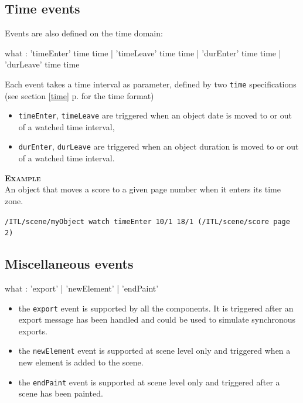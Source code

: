 \documentclass[a4paper,twoside]{report}
\newcommand{\subsublevel}[1]	{\subsection{#1}}
\newcommand{\fullref}[1]	{\ref{#1} p.\pageref{#1}}
\newcommand{\OSC}[1]		{\texttt{#1}}
\newcommand{\example}		{\textbf{\hspace{-1.5cm}\textbf{\textsc{Example }}}}
\newcommand{\samplev}[1]			{\begin{center}\colorbox{mygrey}{
								\begin{minipage}[t]{\columnwidth} 
								{\small \texttt{#1}}
								\end{minipage}}\end{center}}
\begin{document}
\subsublevel{Time events}
\label{timeevents}

Events are also defined on the time domain:
\begin{rail}
what : 	'timeEnter' time time | 'timeLeave' time time 
		| 'durEnter' time time | 'durLeave' time time 
\end{rail}

Each event takes a time interval as parameter, defined by two \OSC{time} specifications (see section \fullref{time} for the time format)

\begin{itemize}
\item \OSC{timeEnter}, \OSC{timeLeave} are triggered when an object date is moved to or out of a watched time interval,
\item \OSC{durEnter}, \OSC{durLeave} are triggered when an object duration is moved to or out of a watched time interval.
\end{itemize}

\example \\
An object that moves a score to a given page number when it enters its time zone.
\samplev{/ITL/scene/myObject watch timeEnter 10/1 18/1 (/ITL/scene/score page 2)}


\subsublevel{Miscellaneous events}
\label{miscevents}

\begin{rail}
what : 	  'export'
		| 'newElement'
		| 'endPaint'
\end{rail}

\begin{itemize}
\item the \OSC{export} event is supported by all the components. It is triggered after an export message has been handled and could be used to simulate synchronous exports.
\item the \OSC{newElement} event is supported at scene level only and triggered when a new element is added to the scene.
\item the \OSC{endPaint} event is supported at scene level only and triggered after a scene has been painted.
\end{itemize}
\end{document}
